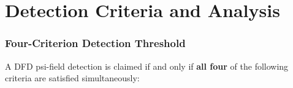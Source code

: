 \documentclass[11pt]{article}
\begin{document}
\part{Detection Criteria and Analysis}

\section{Four-Criterion Detection Threshold}
\label{sec:detection_criteria}

A DFD psi-field detection is claimed if and only if \textbf{all four}
of the following criteria are satisfied simultaneously:
\end{document}

